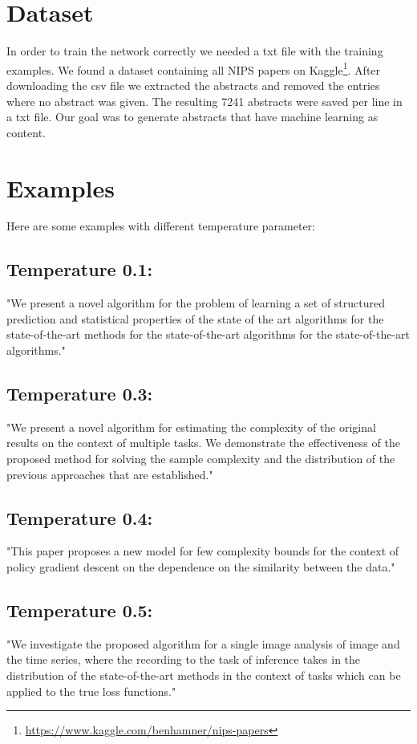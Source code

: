 \documentclass[a4paper]{article}
\begin{document}
\section{Dataset}
In order to train the network correctly we needed a txt file with the training examples. We found a dataset containing all NIPS papers on Kaggle\footnote{\url{https://www.kaggle.com/benhamner/nips-papers}}. After downloading the csv file we extracted the abstracts and removed the entries where no abstract was given. The resulting 7241 abstracts were saved per line in a txt file. Our goal was to generate abstracts that have machine learning as content.

\section{Examples}\label{ex}
Here are some examples with different temperature parameter:

\subsection*{Temperature 0.1:}
"We present a novel algorithm for the problem of learning a set of structured prediction and statistical properties of the state of the art algorithms for the state-of-the-art methods for the state-of-the-art algorithms for the state-of-the-art algorithms."

\subsection*{Temperature 0.3:}
"We present a novel algorithm for estimating the complexity of the original results on the context of multiple tasks. We demonstrate the effectiveness of the proposed method for solving the sample complexity and the distribution of the previous approaches that are established."

\subsection*{Temperature 0.4:}
"This paper proposes a new model for few complexity bounds for the context of policy gradient descent on the dependence on the similarity between the data."

\subsection*{Temperature 0.5:}
"We investigate the proposed algorithm for a single image analysis of image and the time series, where the recording to the task of inference takes in the distribution of the state-of-the-art methods in the context of tasks which can be applied to the true loss functions."
\end{document}
